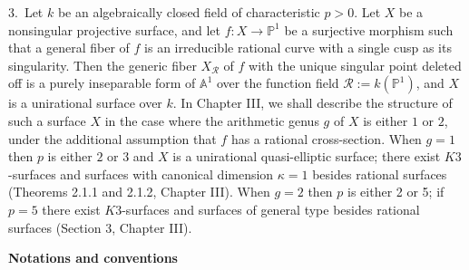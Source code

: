 3.~Let $k$ be an algebraically closed field of characteristic
$p>0$. Let $X$ be a nonsingular projective surface, and let $f:X\to
\mathbb{P}^{1}$ be a surjective morphism such that a general fiber of
$f$ is an irreducible rational curve with a single cusp as its
singularity. Then the generic fiber $X_{\mathscr{R}}$ of $f$ with the
unique singular point deleted off is a purely inseparable form of
$\mathbb{A}^{1}$ over the function field
$\mathscr{R}:=k(\mathbb{P}^{1})$, and $X$ is a unirational surface
over $k$. In Chapter III, we shall describe the structure of such a
surface $X$ in the case where the arithmetic genus $g$ of $X$ is
either $1$ or $2$, under the additional assumption that $f$ has a
rational cross-section. When $g=1$ then $p$ is either $2$ or $3$ and
$X$ is a unirational quasi-elliptic surface; there exist $K3$-surfaces
and surfaces with canonical dimension $\kappa=1$ besides rational
surfaces (\cf Theorems 2.1.1 and 2.1.2, Chapter III). When $g=2$ then
$p$ is either 2 or 5; if $p=5$ there exist $K3$-surfaces and surfaces
of general type besides rational surfaces (\cf Section 3, Chapter
III).

\newpage

\begin{center}
{\bf Notations and conventions}\pageoriginale
\end{center}
\medskip


